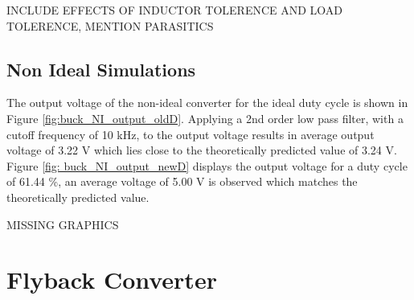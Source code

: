 \documentclass[12pt,twoside]{scrartcl}
\begin{document}
INCLUDE EFFECTS OF INDUCTOR TOLERENCE AND LOAD TOLERENCE, MENTION PARASITICS

\newpage
\subsection{Non Ideal Simulations}
The output voltage of the non-ideal converter for the ideal duty cycle is shown in Figure \ref{fig:buck_NI_output_oldD}. Applying a 2nd order low pass filter, with a cutoff frequency of 10 kHz, to the output voltage results in average output voltage of 3.22 V which lies close to the theoretically predicted value of 3.24 V. Figure \ref{fig: buck_NI_output_newD} displays the output voltage for a duty cycle of 61.44 \%, an average voltage of 5.00 V is observed which matches the theoretically predicted value.

\color{red}MISSING GRAPHICS
\color{black}

\newpage
\section{Flyback Converter}
\end{document}
